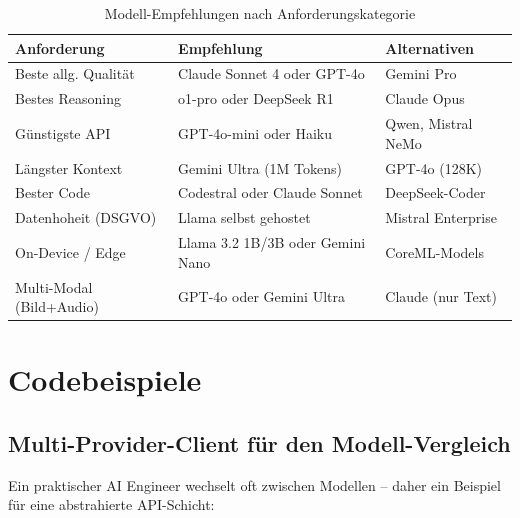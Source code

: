 \begin{table}[H]
\centering
\begin{tabularx}{\linewidth}{lXl}
\toprule
\textbf{Anforderung} & \textbf{Empfehlung} & \textbf{Alternativen} \\
\midrule
Beste allg. Qualität & Claude Sonnet 4 oder GPT-4o & Gemini Pro \\
Bestes Reasoning & o1-pro oder DeepSeek R1 & Claude Opus \\
Günstigste API & GPT-4o-mini oder Haiku & Qwen, Mistral NeMo \\
Längster Kontext & Gemini Ultra (1M Tokens) & GPT-4o (128K) \\
Bester Code & Codestral oder Claude Sonnet & DeepSeek-Coder \\
Datenhoheit (DSGVO) & Llama selbst gehostet & Mistral Enterprise \\
On-Device / Edge & Llama 3.2 1B/3B oder Gemini Nano & CoreML-Models \\
Multi-Modal (Bild+Audio) & GPT-4o oder Gemini Ultra & Claude (nur Text) \\
\bottomrule
\end{tabularx}
\caption{Modell-Empfehlungen nach Anforderungskategorie}
\label{tab:empfehlungen}
\end{table}


\section{Codebeispiele}

\subsection{Multi-Provider-Client für den Modell-Vergleich}

Ein praktischer AI Engineer wechselt oft zwischen Modellen -- daher ein Beispiel für eine abstrahierte API-Schicht:

